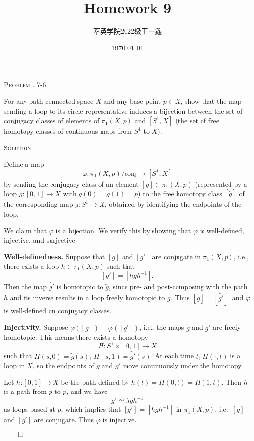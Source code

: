 \documentclass[12pt, a4paper, oneside]{ctexart}
\title{\textbf{Homework 9}}
\author{萃英学院\qquad 2022级\qquad 王一鑫}
\date{\today}
\newcounter{problemname}
\newenvironment{problem}{\begin{framed}\stepcounter{problemname}\par\noindent\textsc{Problem \arabic{problemname}. }}{\end{framed}\par}
\newenvironment{solution}{%
	\par\noindent\textsc{Solution. }\ignorespaces
}{%
	\hfill$\qed$\par
}
\begin{document}
	
	\maketitle
	
	\begin{problem}
	7-6
	
	For any path-connected space \( X \) and any base point \( p \in X \), show that the map sending a loop to its circle representative induces a bijection between the set of conjugacy classes of elements of \( \pi_1(X, p) \) and \( [S^1, X] \) (the set of free homotopy classes of continuous maps from \( S^1 \) to \( X \)).
	
	\end{problem}
	
	\begin{solution}
		
		Define a map
		\[
		\varphi : \pi_1(X, p)/\text{conj} \longrightarrow [S^1, X]
		\]
		by sending the conjugacy class of an element \( [g] \in \pi_1(X, p) \) (represented by a loop \( g: [0,1] \to X \) with \( g(0) = g(1) = p \)) to the free homotopy class \( [\tilde{g}] \) of the corresponding map \( \tilde{g}: S^1 \to X \), obtained by identifying the endpoints of the loop.
		
		We claim that \( \varphi \) is a bijection. We verify this by showing that \( \varphi \) is well-defined, injective, and surjective.
		
		\textbf{Well-definedness.} Suppose that \( [g] \) and \( [g'] \) are conjugate in \( \pi_1(X, p) \), i.e., there exists a loop \( h \in \pi_1(X, p) \) such that
		\[
		[g'] = [hgh^{-1}].
		\]
		Then the map \( \tilde{g'} \) is homotopic to \( \tilde{g} \), since pre- and post-composing with the path \( h \) and its inverse results in a loop freely homotopic to \( g \). Thus \( [\tilde{g}] = [\tilde{g'}] \), and \( \varphi \) is well-defined on conjugacy classes.
		
		\textbf{Injectivity.} Suppose \( \varphi([g]) = \varphi([g']) \), i.e., the maps \( \tilde{g} \) and \( \tilde{g'} \) are freely homotopic. This means there exists a homotopy
		\[
		H : S^1 \times [0,1] \to X
		\]
		such that \( H(s, 0) = \tilde{g}(s) \), \( H(s, 1) = \tilde{g'}(s) \). At each time \( t \), \( H(\cdot, t) \) is a loop in \( X \), so the endpoints of \( g \) and \( g' \) move continuously under the homotopy.
		
		Let \( h : [0,1] \to X \) be the path defined by \( h(t) = H(0, t) = H(1, t) \). Then \( h \) is a path from \( p \) to \( p \), and we have
		\[
		g' \simeq hgh^{-1}
		\]
		as loops based at \( p \), which implies that \( [g'] = [hgh^{-1}] \) in \( \pi_1(X, p) \), i.e., \( [g] \) and \( [g'] \) are conjugate. Thus \( \varphi \) is injective.
		

\end{solution}
\end{document}
